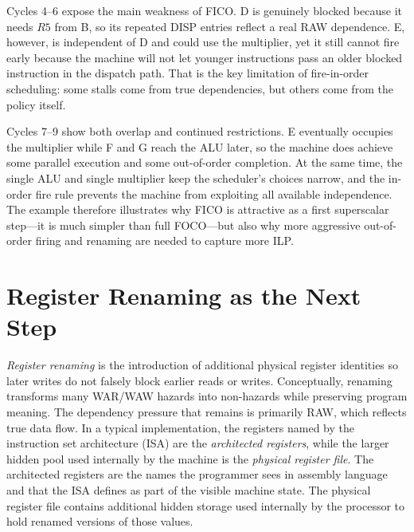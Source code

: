 Cycles 4--6 expose the main weakness of FICO\@.
D is genuinely blocked because it needs $R5$ from B, so its repeated DISP entries reflect a real RAW dependence.
E, however, is independent of D and could use the multiplier, yet it still cannot fire early because the machine will not let younger instructions pass an older blocked instruction in the dispatch path.
That is the key limitation of fire-in-order scheduling: some stalls come from true dependencies, but others come from the policy itself.

Cycles 7--9 show both overlap and continued restrictions.
E eventually occupies the multiplier while F and G reach the ALU later, so the machine does achieve some parallel execution and some out-of-order completion.
At the same time, the single ALU and single multiplier keep the scheduler's choices narrow, and the in-order fire rule prevents the machine from exploiting all available independence.
The example therefore illustrates why FICO is attractive as a first superscalar step---it is much simpler than full FOCO---but also why more aggressive out-of-order firing and renaming are needed to capture more ILP\@.


\section{Register Renaming as the Next Step}\label{sec:ilp-renaming}
\textit{Register renaming} is the introduction of additional physical register identities so later writes do not falsely block earlier reads or writes.
Conceptually, renaming transforms many WAR/WAW hazards into non-hazards while preserving program meaning.
The dependency pressure that remains is primarily RAW, which reflects true data flow.
In a typical implementation, the registers named by the instruction set architecture (ISA) are the \textit{architected registers}, while the larger hidden pool used internally by the machine is the \textit{physical register file}.
The architected registers are the names the programmer sees in assembly language and that the ISA defines as part of the visible machine state.
The physical register file contains additional hidden storage used internally by the processor to hold renamed versions of those values.

